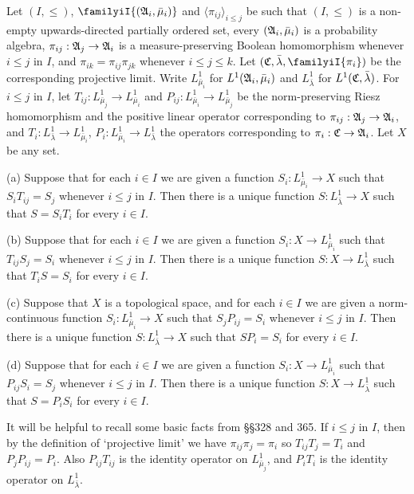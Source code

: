 Let $(I,\le)$, $\familyiI{(\frak A_i,\bar\mu_i)}$ and
$\langle\pi_{ij}\rangle_{i\le j}$ be such that $(I,\le)$ is a non-empty
upwards-directed partially ordered
set, every $(\frak A_i,\bar\mu_i)$ is a probability
algebra, $\pi_{ij}:\frak A_j\to\frak A_i$ is a measure-preserving
Boolean homomorphism whenever $i\le j$ in $I$, and
$\pi_{ik}=\pi_{ij}\pi_{jk}$ whenever $i\le j\le k$.   Let
$(\frak C,\bar\lambda,\familyiI{\pi_i})$ be the corresponding projective
limit.   Write $L^1_{\bar\mu_i}$ for
$L^1(\frak A_i,\bar\mu_i)$ and $L^1_{\bar\lambda}$ for
$L^1(\frak C,\bar\lambda)$.   For $i\le j$ in $I$, let
$T_{ij}:L^1_{\bar\mu_j}\to L^1_{\bar\mu_i}$ and
$P_{ij}:L^1_{\bar\mu_i}\to L^1_{\bar\mu_j}$ be the
norm-preserving Riesz homomorphism and the positive linear operator
corresponding to $\pi_{ij}:\frak A_j\to\frak A_i$,
and $T_i:L^1_{\bar\lambda}\to L^1_{\bar\mu_i}$,
$P_i:L^1_{\bar\mu_i}\to L^1_{\bar\lambda}$ the operators corresponding to
$\pi_i:\frak C\to\frak A_i$.   Let $X$ be any set.

(a) Suppose that for each $i\in I$ we are given a function
$S_i:L^1_{\bar\mu_i}\to X$ such that $S_iT_{ij}=S_j$ whenever $i\le j$
in $I$.   Then there is a unique function $S:L^1_{\bar\lambda}\to X$ such
that $S=S_iT_i$ for every $i\in I$.

(b) Suppose that for each $i\in I$ we are given a function
$S_i:X\to L^1_{\bar\mu_i}$ such that $T_{ij}S_j=S_i$ whenever $i\le j$
in $I$.   Then there is a unique function $S:X\to L^1_{\bar\lambda}$ such
that $T_iS=S_i$ for every $i\in I$.

(c) Suppose that $X$ is a topological space, and
for each $i\in I$ we are given a norm-continuous function
$S_i:L^1_{\bar\mu_i}\to X$ such that $S_jP_{ij}=S_i$ whenever $i\le j$
in $I$.   Then there is a unique function $S:L^1_{\bar\lambda}\to X$ such
that $SP_i=S_i$ for every $i\in I$.

(d) Suppose that for each $i\in I$ we are given a function
$S_i:X\to L^1_{\bar\mu_i}$ such that $P_{ij}S_i=S_j$ whenever $i\le j$ in
$I$.   Then there is a unique function $S:X\to L^1_{\bar\lambda}$ such that
$S=P_iS_i$ for every $i\in I$.

\ifwithproofs\medskip

 It will be helpful to
recall some basic facts from \S\S328 and 365.
If $i\le j$ in $I$, then by the definition of `projective limit' we have
$\pi_{ij}\pi_j=\pi_i$ so
$T_{ij}T_j=T_i$ and $P_jP_{ij}=P_i$.
Also $P_{ij}T_{ij}$ is the identity operator on $L^1_{\bar\mu_j}$, and
$P_iT_i$ is the identity operator on $L^1_{\bar\lambda}$.

